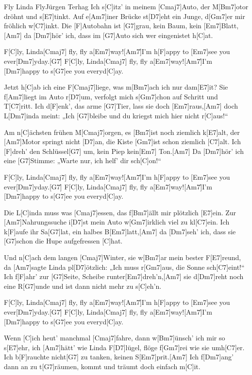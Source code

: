 \documentclass[../main.tex]{subfiles}
\begin{document}
\begin{song}[5]{Fly Linda Fly}{Jürgen Terhag}{}
Ich s[C]itz' in meinem [Cmaj7]Auto, der M[Bm7]otor dröhnt und s[E7]tinkt.
Auf e[Am7]iner Brücke st[D7]eht ein Junge, d[Gm7]er mir fröhlich w[C7]inkt.
Die [F]Autobahn ist [G7]grau, kein Baum, kein [Em7]Blatt,[Am7]{\hh}
da [Dm7]hör' ich, dass im [G7]Auto sich wer eingenistet h[C]at.

F[C]ly, Linda[Cmaj7]{ fly}, fly a[Em7]way![Am7]{\h}I'm h[F]appy to [Em7]see you ever[Dm7]yday.[G7]{\h}
F[C]ly, Linda[Cmaj7]{ fly}, fly a[Em7]way![Am7]{\h}I'm [Dm7]happy to s[G7]ee you everyd[C]ay.

Jetzt h[C]ab ich eine F[Cmaj7]liege, was m[Bm7]ach ich nur dam[E7]it?
Sie f[Am7]liegt im Auto r[D7]um, verfolgt mich s[Gm7]chon auf Schritt und T[C7]ritt.
Ich d[F]enk’, das arme [G7]Tier, lass sie doch [Em7]raus,[Am7]{\hh}
doch L[Dm7]inda meint: „Ich [G7]bleibe und du kriegst mich hier nicht r[C]aus!“

Am n[C]{ä}chsten frühen M[Cmaj7]orgen, es [Bm7]ist noch ziemlich k[E7]alt,
der [Am7]Motor springt nicht [D7]an, die Kiste [Gm7]ist schon ziemlich [C7]alt.
Ich [F]dreh’ den Schlüssel[G7] um, kein Piep kein[Em7] Ton.[Am7]{\hh}
Da [Dm7]hör’ ich eine [G7]Stimme: „Warte nur, ich helf’ dir sch[C]on!“

F[C]ly, Linda[Cmaj7]{ fly}, fly a[Em7]way![Am7]{\h}I'm h[F]appy to [Em7]see you ever[Dm7]yday.[G7]{\h}
F[C]ly, Linda[Cmaj7]{ fly}, fly a[Em7]way![Am7]{\h}I'm [Dm7]happy to s[G7]ee you everyd[C]ay.

Die L[C]inda muss was [Cmaj7]essen, das f[Bm7]{ä}llt mir plötzlich [E7]ein.
Zur [Am7]Nahrungssuche i[D7]st mein Auto w[Gm7]irklich viel zu kl[C7]ein.
Ich k[F]aufe ihr Sa[G7]lat, ein halbes B[Em7]latt,[Am7]{\hh}
da [Dm7]seh’ ich, dass sie [G7]schon die Hupe aufgefressen [C]hat.

Und n[C]ach dem langen [Cmaj7]Winter, sie w[Bm7]ar mein bester F[E7]reund,
da [Am7]sagte Linda pl[D7]{ö}tzlich: „Ich muss r[Gm7]aus, die Sonne sch[C7]eint!“
Ich f[F]ahr’ zur [G7]Seite, Scheibe runter[Em7]dreh’n,[Am7]{\hh}
sie d[Dm7]reht noch eine R[G7]unde und ist dann nicht mehr zu s[C]eh’n.

F[C]ly, Linda[Cmaj7]{ fly}, fly a[Em7]way![Am7]{\h}I'm h[F]appy to [Em7]see you ever[Dm7]yday.[G7]{\h}
F[C]ly, Linda[Cmaj7]{ fly}, fly a[Em7]way![Am7]{\h}I'm [Dm7]happy to s[G7]ee you everyd[C]ay.

Wenn [C]ich heut’ manchmal [Cmaj7]fahre, dann w[Bm7]{ü}nsch’ ich mir so s[E7]ehr,
ich [Am7]hätt’ wie Linda F[D7]lügel, flöge f[Gm7]rei wie sie umh[C7]er.
Ich b[F]rauchte nicht[G7] zu tanken, keinen S[Em7]prit.[Am7]{\hh}
Ich f[Dm7]ang’ dann an zu t[G7]räumen, kommt und träumt doch einfach m[C]it.

\end{song}
\end{document}
